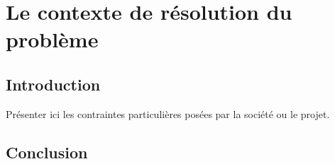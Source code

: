 \chapter{Le contexte de résolution du problème}
\minitoc
\newpage
 
\section{Introduction}

Présenter ici les contraintes particulières posées par la société ou le projet.


\section{Conclusion }
